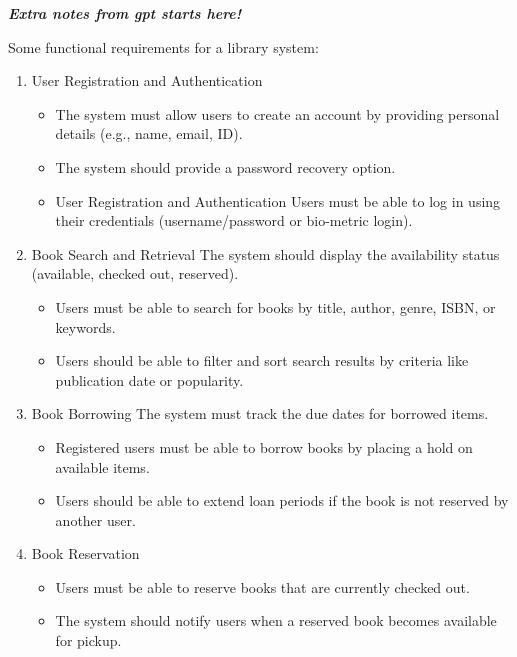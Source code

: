 \documentclass[a4paper]{article}
\begin{document}
\textbf{\textit{Extra notes from gpt starts here! }}

{\raggedright \begin{large} Some functional requirements for a library system:\end{large}\par }
    \begin{enumerate}[(1)]
        \item User Registration and Authentication 
            \begin{itemize}
                \item  The system must allow users to create an account by providing personal details (e.g., name, email, ID). 
                \item  The system should provide a password recovery option.
                \item  User Registration and Authentication Users must be able to log in using their credentials (username/password 
                    or bio-metric login).
            \end{itemize}
        \item Book Search and Retrieval The system should display the availability status (available, checked out, reserved). 
            \begin{itemize}
                \item  Users must be able to search for books by title, author, genre, ISBN, or keywords. 
                \item  Users should be able to filter and sort search results by criteria like publication date or popularity.
            \end{itemize}
        \item Book Borrowing The system must track the due dates for borrowed items. 
            \begin{itemize}
                \item  Registered users must be able to borrow books by placing a hold on available items. 
                \item  Users should be able to extend loan periods if the book is not reserved by another user.
            \end{itemize}
        \item Book Reservation 
            \begin{itemize}
                \item  Users must be able to reserve books that are currently checked out. 
                \item  The system should notify users when a reserved book becomes available for pickup. 

\end{itemize}
\end{enumerate}
\end{document}
